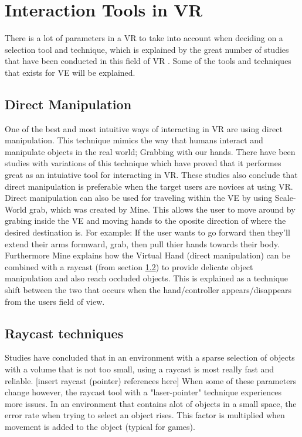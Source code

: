 \section{Interaction Tools in VR}
\label{theory:toolsandtech}
There is a lot of parameters in a VR to take into account when deciding on a selection tool and technique, which is explained by the great number of studies that have been conducted in this field of VR \cite{tools:poupyrev1996go,tools:mine1997moving,tools:Cutler1997,tools:bowman2001introduction}. Some of the tools and techniques that exists for VE will be explained.

\subsection{Direct Manipulation}
\label{theory:toolsandtech:direct}
One of the best and most intuitive ways of interacting in VR are using direct manipulation.\cite{tools:jacoby1994gestural} This technique mimics the way that humans interact and manipulate objects in the real world; Grabbing with our hands. There have been studies with variations of this technique which have proved that it performes great as an intuiative tool for interacting in VR.\cite{tools:Buchmann2004,tools:Cutler1997} These studies also conclude that direct manipulation is preferable when the target users are novices at using VR. Direct manipulation can also be used for traveling within the VE by using Scale-World grab, which was created by Mine.\cite{tools:mine1997moving} This allows the user to move around by grabing inside the VE and moving hands to the oposite direction of where the desired destination is. For example: If the user wants to go forward then they'll extend their arms formward, grab, then pull thier hands towards their body. Furthermore Mine explains how the Virtual Hand (direct manipulation) can be combined with a raycast (from section \ref{theory:toolsandtech:raycast}) to provide delicate object manipulation and also reach occluded objects. This is explained as a technique shift between the two that occurs when the hand/controller appears/disappears from the users field of view.

\subsection{Raycast techniques}
\label{theory:toolsandtech:raycast}
Studies have concluded that in an environment with a sparse selection of objects with a volume that is not too small, using a raycast is most really fast and reliable. [insert raycast (pointer) references here] When some of these parameters change however, the raycast tool with a "laser-pointer" technique experiences more issues. In an environment that contains alot of objects in a small space, the error rate when trying to select an object rises.\cite{tools:ware1988using} This factor is multiplied when movement is added to the object (typical for games).

